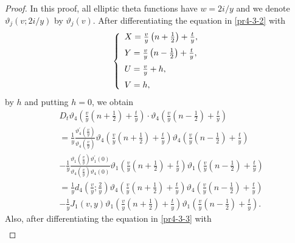 \documentclass[10pt,leqno]{amsart}
\numberwithin{equation}{section}
\begin{document}
\begin{proof}
In this proof, all elliptic theta functions have $w=2i/y$ and we denote $\vartheta_j(v; 2i/y)$ by $\vartheta_j(v)$.
After differentiating the equation in \eqref{pr4-3-2} with
\begin{eqnarray}\label{prtheorem2-1}
\left\{
\begin{array}{l}
\vspace{2mm}
X=\frac{v}{y}\left(n+\frac{1}{2}\right)+\frac{t}{y},\\
\vspace{2mm}
Y=\frac{v}{y}\left(n-\frac{1}{2}\right)+\frac{t}{y},\\
\vspace{2mm}
U=\frac{v}{y}+h,\\
V=h,\\
\end{array}
\right.
\end{eqnarray}
by $h$ and putting $h=0$, we obtain
\begin{equation}\label{prtheorem2-2}
\begin{split}
&D_{t} \vartheta_4\left(\frac{v}{y}\left(n+\frac{1}{2}\right)+\frac{t}{y}\right) \cdot \vartheta_4\left(\frac{v}{y}\left(n-\frac{1}{2}\right)+\frac{t}{y}\right) \\
&=\frac{1}{y}\frac{\vartheta^{'}_{4}\left(\frac{v}{y}\right)}{\vartheta_{4}\left(\frac{v}{y}\right)}\vartheta_4\left(\frac{v}{y}\left(n+\frac{1}{2}\right)+\frac{t}{y}\right)\vartheta_4\left(\frac{v}{y}\left(n-\frac{1}{2}\right)+\frac{t}{y}\right)\\
&-\frac{1}{y}\frac{\vartheta_{1}\left(\frac{v}{y}\right)\vartheta^{'}_{1}\left(0\right)}{\vartheta_{4}\left(\frac{v}{y}\right)\vartheta_{4}\left(0\right)}\vartheta_1\left(\frac{v}{y}\left(n+\frac{1}{2}\right)+\frac{t}{y}\right)\vartheta_1\left(\frac{v}{y}\left(n-\frac{1}{2}\right)+\frac{t}{y}\right)\\
&=\frac{1}{y}d_{4}\left(\frac{v}{y};\frac{2}{y}\right)\vartheta_4\left(\frac{v}{y}\left(n+\frac{1}{2}\right)+\frac{t}{y}\right)\vartheta_4\left(\frac{v}{y}\left(n-\frac{1}{2}\right)+\frac{t}{y}\right)\\
&-\frac{1}{y}J_{1}(v,y)\vartheta_1\left(\frac{v}{y}\left(n+\frac{1}{2}\right)+\frac{t}{y}\right)\vartheta_1\left(\frac{v}{y}\left(n-\frac{1}{2}\right)+\frac{t}{y}\right).
\end{split}
\end{equation}
Also, after differentiating the equation in \eqref{pr4-3-3} with
\begin{eqnarray}\label{prtheorem2-3}

\end{eqnarray}
\end{proof}
\end{document}
